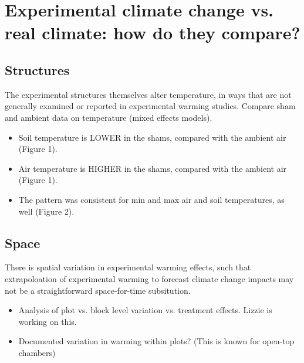 \documentclass{article}
\begin{document}
\section {Experimental climate change vs. real climate:
how do they compare?}
\subsection {Structures}
The experimental structures themselves alter temperature, in ways that are
not generally examined or reported in experimental warming studies. Compare
sham and ambient data on temperature (mixed effects models).
\begin{itemize}
\item Soil temperature is LOWER in the shams, compared with the ambient
air (Figure 1).
\item Air temperature is HIGHER in the shams, compared with the ambient
air (Figure 1).
\item The pattern was consistent for min and max air and soil temperatures, as
well (Figure 2).
\end{itemize}
\subsection {Space}
There is spatial variation in experimental warming effects, such that extrapoloation of experimental warming to forecast climate change impacts may not be a straightforward space-for-time subsitution.
\begin{itemize}
\item Analysis of plot vs. block level variation vs. treatment effects. Lizzie is working on this.
\item Documented variation in warming within plots? (This is known for open-top chambers)
\end{itemize}
\end{document}
